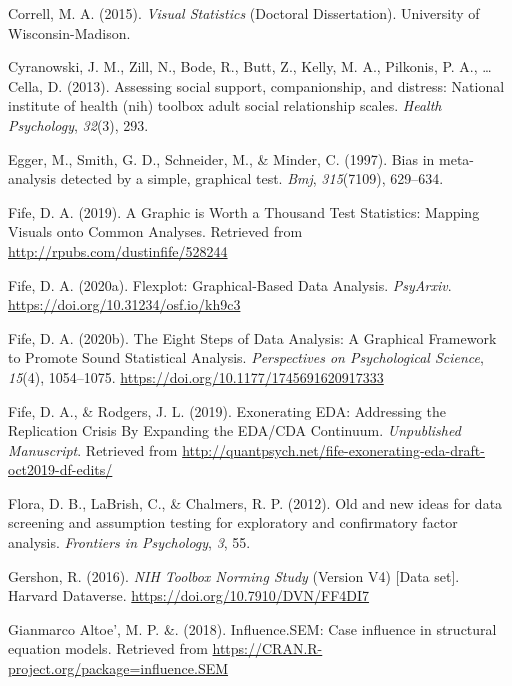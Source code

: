 \documentclass[
  english,
  doc]{apa6}
\newlength{\cslhangindent}
\newenvironment{cslreferences}%
  {\setlength{\parindent}{0pt}%
  \everypar{\setlength{\hangindent}{\cslhangindent}}\ignorespaces}%
  {\par}
\begin{document}
\begin{cslreferences}
\leavevmode\hypertarget{ref-Correll2015}{}%
Correll, M. A. (2015). \emph{Visual Statistics} (Doctoral Dissertation). University of Wisconsin-Madison.

\leavevmode\hypertarget{ref-cyranowski2013assessing}{}%
Cyranowski, J. M., Zill, N., Bode, R., Butt, Z., Kelly, M. A., Pilkonis, P. A., \ldots{} Cella, D. (2013). Assessing social support, companionship, and distress: National institute of health (nih) toolbox adult social relationship scales. \emph{Health Psychology}, \emph{32}(3), 293.

\leavevmode\hypertarget{ref-egger1997bias}{}%
Egger, M., Smith, G. D., Schneider, M., \& Minder, C. (1997). Bias in meta-analysis detected by a simple, graphical test. \emph{Bmj}, \emph{315}(7109), 629--634.

\leavevmode\hypertarget{ref-Fife2019b}{}%
Fife, D. A. (2019). A Graphic is Worth a Thousand Test Statistics: Mapping Visuals onto Common Analyses. Retrieved from \url{http://rpubs.com/dustinfife/528244}

\leavevmode\hypertarget{ref-Fife2019c}{}%
Fife, D. A. (2020a). Flexplot: Graphical-Based Data Analysis. \emph{PsyArxiv}. \url{https://doi.org/10.31234/osf.io/kh9c3}

\leavevmode\hypertarget{ref-Fife2019e}{}%
Fife, D. A. (2020b). The Eight Steps of Data Analysis: A Graphical Framework to Promote Sound Statistical Analysis. \emph{Perspectives on Psychological Science}, \emph{15}(4), 1054--1075. \url{https://doi.org/10.1177/1745691620917333}

\leavevmode\hypertarget{ref-Fife2019a}{}%
Fife, D. A., \& Rodgers, J. L. (2019). Exonerating EDA: Addressing the Replication Crisis By Expanding the EDA/CDA Continuum. \emph{Unpublished Manuscript}. Retrieved from \url{http://quantpsych.net/fife-exonerating-eda-draft-oct2019-df-edits/}

\leavevmode\hypertarget{ref-flora2012old}{}%
Flora, D. B., LaBrish, C., \& Chalmers, R. P. (2012). Old and new ideas for data screening and assumption testing for exploratory and confirmatory factor analysis. \emph{Frontiers in Psychology}, \emph{3}, 55.

\leavevmode\hypertarget{ref-gershon2016}{}%
Gershon, R. (2016). \emph{NIH Toolbox Norming Study} (Version V4) {[}Data set{]}. Harvard Dataverse. \url{https://doi.org/10.7910/DVN/FF4DI7}

\leavevmode\hypertarget{ref-influenceSEM}{}%
Gianmarco Altoe', M. P. \&. (2018). Influence.SEM: Case influence in structural equation models. Retrieved from \url{https://CRAN.R-project.org/package=influence.SEM}


\end{cslreferences}
\end{document}

